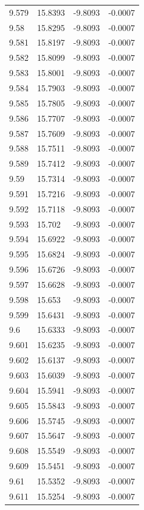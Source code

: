 \begin{tabular}{llll}
9.579 & 15.8393 & -9.8093 & -0.0007 \\
9.58 & 15.8295 & -9.8093 & -0.0007 \\
9.581 & 15.8197 & -9.8093 & -0.0007 \\
9.582 & 15.8099 & -9.8093 & -0.0007 \\
9.583 & 15.8001 & -9.8093 & -0.0007 \\
9.584 & 15.7903 & -9.8093 & -0.0007 \\
9.585 & 15.7805 & -9.8093 & -0.0007 \\
9.586 & 15.7707 & -9.8093 & -0.0007 \\
9.587 & 15.7609 & -9.8093 & -0.0007 \\
9.588 & 15.7511 & -9.8093 & -0.0007 \\
9.589 & 15.7412 & -9.8093 & -0.0007 \\
9.59 & 15.7314 & -9.8093 & -0.0007 \\
9.591 & 15.7216 & -9.8093 & -0.0007 \\
9.592 & 15.7118 & -9.8093 & -0.0007 \\
9.593 & 15.702 & -9.8093 & -0.0007 \\
9.594 & 15.6922 & -9.8093 & -0.0007 \\
9.595 & 15.6824 & -9.8093 & -0.0007 \\
9.596 & 15.6726 & -9.8093 & -0.0007 \\
9.597 & 15.6628 & -9.8093 & -0.0007 \\
9.598 & 15.653 & -9.8093 & -0.0007 \\
9.599 & 15.6431 & -9.8093 & -0.0007 \\
9.6 & 15.6333 & -9.8093 & -0.0007 \\
9.601 & 15.6235 & -9.8093 & -0.0007 \\
9.602 & 15.6137 & -9.8093 & -0.0007 \\
9.603 & 15.6039 & -9.8093 & -0.0007 \\
9.604 & 15.5941 & -9.8093 & -0.0007 \\
9.605 & 15.5843 & -9.8093 & -0.0007 \\
9.606 & 15.5745 & -9.8093 & -0.0007 \\
9.607 & 15.5647 & -9.8093 & -0.0007 \\
9.608 & 15.5549 & -9.8093 & -0.0007 \\
9.609 & 15.5451 & -9.8093 & -0.0007 \\
9.61 & 15.5352 & -9.8093 & -0.0007 \\
9.611 & 15.5254 & -9.8093 & -0.0007 \\

\end{tabular}
